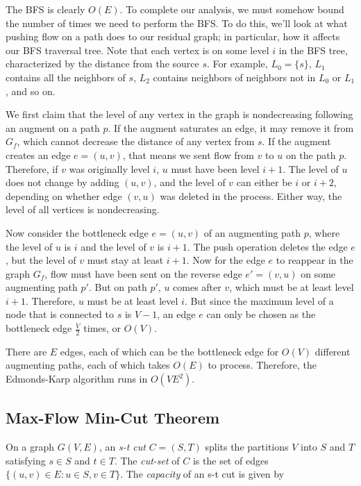 \documentclass[11pt]{book}
\begin{document}
The BFS is clearly $O(E)$. To complete our analysis, we must somehow bound the number of times we need to perform the BFS. To do this, we'll look at what pushing flow on a path does to our residual graph; in particular, how it affects our BFS traversal tree. Note that each vertex is on some level $i$ in the BFS tree, characterized by the distance from the source $s$. For example, $L_0 = \{s\}$, $L_1$ contains all the neighbors of $s$, $L_2$ contains neighbors of neighbors not in $L_0$ or $L_1$, and so on.

We first claim that the level of any vertex in the graph is nondecreasing following an augment on a path $p$. If the augment saturates an edge, it may remove it from $G_f$, which cannot decrease the distance of any vertex from $s$. If the augment creates an edge $e=(u,v)$, that means we sent flow from $v$ to $u$ on the path $p$. Therefore, if $v$ was originally level $i$, $u$ must have been level $i+1$. The level of $u$ does not change by adding $(u,v)$, and the level of $v$ can either be $i$ or $i+2$, depending on whether edge $(v,u)$ was deleted in the process. Either way, the level of all vertices is nondecreasing.

Now consider the bottleneck edge $e=(u,v)$ of an augmenting path $p$, where the level of $u$ is $i$ and the level of $v$ is $i+1$. The push operation deletes the edge $e$, but the level of $v$ must stay at least $i+1$. Now for the edge $e$ to reappear in the graph $G_f$, flow must have been sent on the reverse edge $e'=(v,u)$ on some augmenting path $p'$. But on path $p'$, $u$ comes after $v$, which must be at least level $i+1$. Therefore, $u$ must be at least level $i$. But since the maximum level of a node that is connected to $s$ is $V-1$, an edge $e$ can only be chosen as the bottleneck edge $\frac{V}{2}$ times, or $O(V)$.

There are $E$ edges, each of which can be the bottleneck edge for $O(V)$ different augmenting paths, each of which takes $O(E)$ to process. Therefore, the Edmonds-Karp algorithm runs in $O(VE^2)$.

\subsection{Max-Flow Min-Cut Theorem}

On a graph $G(V,E)$, an \textit{s-t cut} $C=(S,T)$ splits the partitions $V$ into $S$ and $T$ satisfying $s \in S$ and $t \in T$. The \textit{cut-set} of $C$ is the set of edges $\{(u,v) \in E : u \in S, v \in T\}$. The \textit{capacity} of an s-t cut is given by
\end{document}
